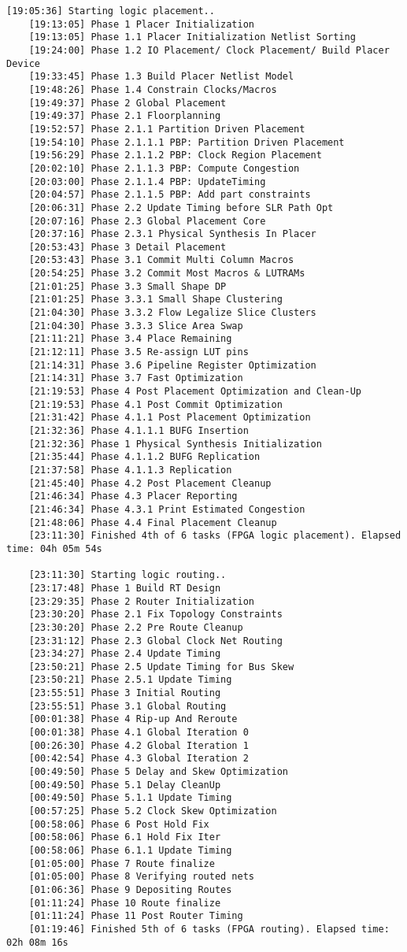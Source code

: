 \begin{lstlisting}[caption=Содержимое файла v++\_vinc.log, label={log1}]
	[19:05:36] Starting logic placement..
	[19:13:05] Phase 1 Placer Initialization
	[19:13:05] Phase 1.1 Placer Initialization Netlist Sorting
	[19:24:00] Phase 1.2 IO Placement/ Clock Placement/ Build Placer Device
	[19:33:45] Phase 1.3 Build Placer Netlist Model
	[19:48:26] Phase 1.4 Constrain Clocks/Macros
	[19:49:37] Phase 2 Global Placement
	[19:49:37] Phase 2.1 Floorplanning
	[19:52:57] Phase 2.1.1 Partition Driven Placement
	[19:54:10] Phase 2.1.1.1 PBP: Partition Driven Placement
	[19:56:29] Phase 2.1.1.2 PBP: Clock Region Placement
	[20:02:10] Phase 2.1.1.3 PBP: Compute Congestion
	[20:03:00] Phase 2.1.1.4 PBP: UpdateTiming
	[20:04:57] Phase 2.1.1.5 PBP: Add part constraints
	[20:06:31] Phase 2.2 Update Timing before SLR Path Opt
	[20:07:16] Phase 2.3 Global Placement Core
	[20:37:16] Phase 2.3.1 Physical Synthesis In Placer
	[20:53:43] Phase 3 Detail Placement
	[20:53:43] Phase 3.1 Commit Multi Column Macros
	[20:54:25] Phase 3.2 Commit Most Macros & LUTRAMs
	[21:01:25] Phase 3.3 Small Shape DP
	[21:01:25] Phase 3.3.1 Small Shape Clustering
	[21:04:30] Phase 3.3.2 Flow Legalize Slice Clusters
	[21:04:30] Phase 3.3.3 Slice Area Swap
	[21:11:21] Phase 3.4 Place Remaining
	[21:12:11] Phase 3.5 Re-assign LUT pins
	[21:14:31] Phase 3.6 Pipeline Register Optimization
	[21:14:31] Phase 3.7 Fast Optimization
	[21:19:53] Phase 4 Post Placement Optimization and Clean-Up
	[21:19:53] Phase 4.1 Post Commit Optimization
	[21:31:42] Phase 4.1.1 Post Placement Optimization
	[21:32:36] Phase 4.1.1.1 BUFG Insertion
	[21:32:36] Phase 1 Physical Synthesis Initialization
	[21:35:44] Phase 4.1.1.2 BUFG Replication
	[21:37:58] Phase 4.1.1.3 Replication
	[21:45:40] Phase 4.2 Post Placement Cleanup
	[21:46:34] Phase 4.3 Placer Reporting
	[21:46:34] Phase 4.3.1 Print Estimated Congestion
	[21:48:06] Phase 4.4 Final Placement Cleanup
	[23:11:30] Finished 4th of 6 tasks (FPGA logic placement). Elapsed time: 04h 05m 54s 
	
	[23:11:30] Starting logic routing..
	[23:17:48] Phase 1 Build RT Design
	[23:29:35] Phase 2 Router Initialization
	[23:30:20] Phase 2.1 Fix Topology Constraints
	[23:30:20] Phase 2.2 Pre Route Cleanup
	[23:31:12] Phase 2.3 Global Clock Net Routing
	[23:34:27] Phase 2.4 Update Timing
	[23:50:21] Phase 2.5 Update Timing for Bus Skew
	[23:50:21] Phase 2.5.1 Update Timing
	[23:55:51] Phase 3 Initial Routing
	[23:55:51] Phase 3.1 Global Routing
	[00:01:38] Phase 4 Rip-up And Reroute
	[00:01:38] Phase 4.1 Global Iteration 0
	[00:26:30] Phase 4.2 Global Iteration 1
	[00:42:54] Phase 4.3 Global Iteration 2
	[00:49:50] Phase 5 Delay and Skew Optimization
	[00:49:50] Phase 5.1 Delay CleanUp
	[00:49:50] Phase 5.1.1 Update Timing
	[00:57:25] Phase 5.2 Clock Skew Optimization
	[00:58:06] Phase 6 Post Hold Fix
	[00:58:06] Phase 6.1 Hold Fix Iter
	[00:58:06] Phase 6.1.1 Update Timing
	[01:05:00] Phase 7 Route finalize
	[01:05:00] Phase 8 Verifying routed nets
	[01:06:36] Phase 9 Depositing Routes
	[01:11:24] Phase 10 Route finalize
	[01:11:24] Phase 11 Post Router Timing
	[01:19:46] Finished 5th of 6 tasks (FPGA routing). Elapsed time: 02h 08m 16s 
	

\end{lstlisting}
